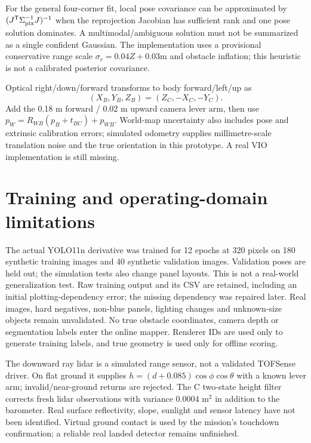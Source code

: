 For the general four-corner fit, local pose covariance can be approximated by
$(J^{\mathsf T}\Sigma_{\rm pix}^{-1}J)^{-1}$ when the reprojection Jacobian has
sufficient rank and one pose solution dominates. A multimodal/ambiguous solution
must not be summarized as a single confident Gaussian. The implementation uses
a provisional conservative range scale $\sigma_r=0.04Z+0.03$m and obstacle
inflation; this heuristic is not a calibrated posterior covariance.

Optical right/down/forward transforms to body forward/left/up as
\begin{equation}(X_B,Y_B,Z_B)=(Z_C,-X_C,-Y_C).\end{equation}
Add the 0.18 m forward / 0.02 m upward camera lever arm, then use
$p_W=R_{WB}(p_B+t_{BC})+p_{WB}$.
World-map uncertainty also includes pose and extrinsic calibration errors;
simulated odometry supplies millimetre-scale translation noise and the true
orientation in this prototype. A real VIO implementation is still missing.

\section{Training and operating-domain limitations}
The actual YOLO11n derivative was trained for 12 epochs at 320 pixels on 180 synthetic
training images and 40 synthetic validation images. Validation poses are held out;
the simulation tests also change panel layouts. This is not a real-world
generalization test. Raw training output and its CSV are retained, including an
initial plotting-dependency error; the missing dependency was repaired later.
Real images, hard negatives, non-blue panels, lighting changes and unknown-size
objects remain unvalidated. No true obstacle coordinates, camera depth or
segmentation labels enter the online mapper. Renderer IDs are used only to
generate training labels, and true geometry is used only for offline scoring.

The downward ray lidar is a simulated range sensor, not a validated TOFSense
driver. On flat ground it supplies $h=(d+0.085)\cos\phi\cos\theta$ with a known
lever arm; invalid/near-ground returns are rejected. The C two-state height
filter corrects fresh lidar observations with variance 0.0004 m$^2$ in addition
to the barometer. Real surface reflectivity, slope, sunlight and sensor latency
have not been identified. Virtual ground contact is used by the mission's
touchdown confirmation; a reliable real landed detector remains unfinished.

